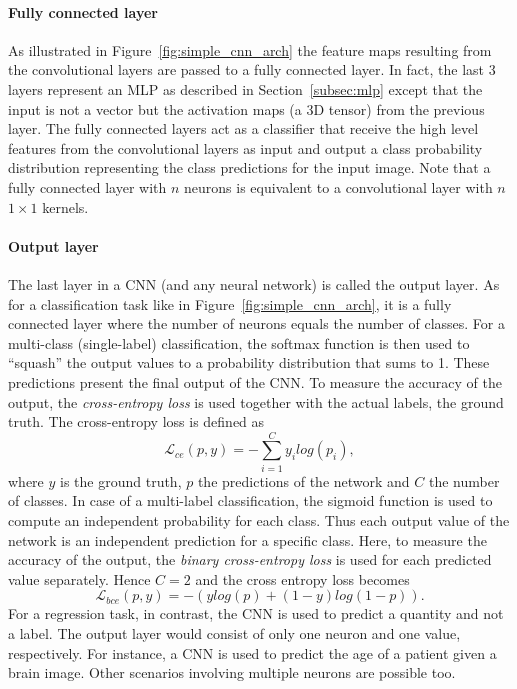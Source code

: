 \documentclass[a4paper,12pt]{report}
\begin{document}
\paragraph{Fully connected layer    } As illustrated in Figure~\ref{fig:simple_cnn_arch} the feature maps resulting from the convolutional layers are passed to a fully connected layer. In fact, the last 3 layers represent an MLP as described in Section~\ref{subsec:mlp} except that the input is not a vector but the activation maps (a 3D tensor) from the previous layer. The fully connected layers act as a classifier that receive the high level features from the convolutional layers as input and output a class probability distribution representing the class predictions for the input image. Note that a fully connected layer with $n$ neurons is equivalent to a convolutional layer with $n$ $1 \times 1$ kernels.

\paragraph{Output layer} 
The last layer in a CNN (and any neural network) is called the output layer. As for a classification task like in Figure~\ref{fig:simple_cnn_arch}, it is a fully connected layer where the number of neurons equals the number of classes. For a multi-class (single-label) classification, the softmax function is then used to ``squash'' the output values to a probability distribution that sums to 1. These predictions present the final output of the CNN. To measure the accuracy of the output, the \textit{cross-entropy loss} is used together with the actual labels, the ground truth. The cross-entropy loss is defined as 
\begin{equation} \label{eq:cross_entropy}
\mathcal{L}_{ce}(p,y) = -\sum^C_{i=1} y_{i}log(p_{i}),
\end{equation}
where $y$ is the ground truth, $p$ the predictions of the network and $C$ the number of classes. In case of a multi-label classification, the sigmoid function is used to compute an independent probability for each class. Thus each output value of the network is an independent prediction for a specific class. Here, to measure the accuracy of the output, the \textit{binary cross-entropy loss} is used for each predicted value separately. Hence $C=2$ and the cross entropy loss becomes
\begin{equation} \label{eq:cross_entropy_binary}
\mathcal{L}_{bce}(p, y) = -(ylog(p) + (1 - y)log(1-p)).
\end{equation}
For a regression task, in contrast, the CNN is used to predict a quantity and not a label. The output layer would consist of only one neuron and one value, respectively. For instance, a CNN is used to predict the age of a patient given a brain image. Other scenarios involving multiple neurons are possible too.
\end{document}
